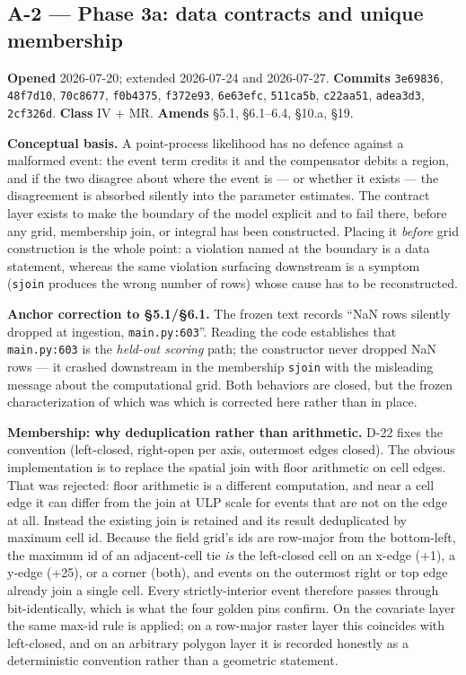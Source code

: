 \documentclass[
  10pt,
]{article}
\begin{document}
\hypertarget{a-2}{%
\subsection{A-2 --- Phase 3a: data contracts and unique membership}\label{a-2}}

\textbf{Opened} 2026-07-20; extended 2026-07-24 and 2026-07-27. \textbf{Commits} \texttt{3e69836}, \texttt{48f7d10}, \texttt{70c8677}, \texttt{f0b4375}, \texttt{f372e93}, \texttt{6e63efc}, \texttt{511ca5b}, \texttt{c22aa51}, \texttt{adea3d3}, \texttt{2cf326d}. \textbf{Class} IV + MR. \textbf{Amends} §5.1, §6.1--6.4, §10.a, §19.

\textbf{Conceptual basis.} A point-process likelihood has no defence against a malformed event: the event term credits it and the compensator debits a region, and if the two disagree about where the event is --- or whether it exists --- the disagreement is absorbed silently into the parameter estimates. The contract layer exists to make the boundary of the model explicit and to fail there, before any grid, membership join, or integral has been constructed. Placing it \emph{before} grid construction is the whole point: a violation named at the boundary is a data statement, whereas the same violation surfacing downstream is a symptom (\texttt{sjoin} produces the wrong number of rows) whose cause has to be reconstructed.

\textbf{Anchor correction to §5.1/§6.1.} The frozen text records ``NaN rows silently dropped at ingestion, \texttt{main.py:603}''. Reading the code establishes that \texttt{main.py:603} is the \emph{held-out scoring} path; the constructor never dropped NaN rows --- it crashed downstream in the membership \texttt{sjoin} with the misleading message about the computational grid. Both behaviors are closed, but the frozen characterization of which was which is corrected here rather than in place.

\textbf{Membership: why deduplication rather than arithmetic.} D-22 fixes the convention (left-closed, right-open per axis, outermost edges closed). The obvious implementation is to replace the spatial join with floor arithmetic on cell edges. That was rejected: floor arithmetic is a different computation, and near a cell edge it can differ from the join at ULP scale for events that are not on the edge at all. Instead the existing join is retained and its result deduplicated by maximum cell id. Because the field grid's ids are row-major from the bottom-left, the maximum id of an adjacent-cell tie \emph{is} the left-closed cell on an x-edge (+1), a y-edge (+25), or a corner (both), and events on the outermost right or top edge already join a single cell. Every strictly-interior event therefore passes through bit-identically, which is what the four golden pins confirm. On the covariate layer the same max-id rule is applied; on a row-major raster layer this coincides with left-closed, and on an arbitrary polygon layer it is recorded honestly as a deterministic convention rather than a geometric statement.
\end{document}
